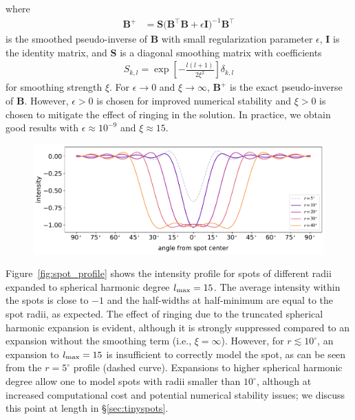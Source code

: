 \documentclass[modern]{aastex62}
\begin{document}
%
%
where
%
\begin{align}
    \mathbf{B}^+ & = \mathbf{S} \Big(\mathbf{B}^\top \mathbf{B} +
    \epsilon \mathbf{I}\Big)^{-1} \mathbf{B}^\top
\end{align}
%
is the smoothed pseudo-inverse of $\mathbf{B}$ with small regularization
parameter $\epsilon$, $\mathbf{I}$ is the identity matrix, and
$\mathbf{S}$ is a diagonal smoothing matrix with coefficients
%
\begin{align}
    S_{k,l} = \exp\left[-\frac{l(l + 1)}{2\xi^2}\right] \delta_{k,l}
\end{align}
%
for smoothing strength $\xi$. For $\epsilon \rightarrow 0$ and
$\xi \rightarrow \infty$,
$\mathbf{B}^+$ is the exact pseudo-inverse of
$\mathbf{B}$. However,
$\epsilon > 0$ is chosen for improved numerical stability and
$\xi > 0$ is chosen to mitigate the effect of ringing in the solution.
In practice, we obtain good results with $\epsilon \approx 10^{-9}$
and $\xi \approx 15$.

\begin{figure}[t!]
    \begin{centering}
        \includegraphics[width=\linewidth]{figures/spot_profile.pdf}
    \end{centering}
\end{figure}

Figure~\ref{fig:spot_profile} shows the intensity profile for spots of
different radii expanded to spherical harmonic degree $l_{\mathrm{max}} = 15$.
The average intensity
within the spots is close to $-1$ and the half-widths at half-minimum are
equal to the spot radii, as expected.
The effect of ringing due to the truncated spherical harmonic expansion is
evident, although it is strongly suppressed compared to an expansion
without the smoothing term (i.e., $\xi = \infty$). However, for
$r \lesssim 10^\circ$, an expansion to $l_{\mathrm{max}} = 15$ is
insufficient to correctly model the spot, as can be seen from the
$r = 5^\circ$ profile (dashed curve). Expansions to higher spherical harmonic
degree allow one to model spots with radii smaller than $10^\circ$, although
at increased computational cost and potential numerical stability issues;
we discuss this point at length in \S\ref{sec:tinyspots}.
\end{document}
